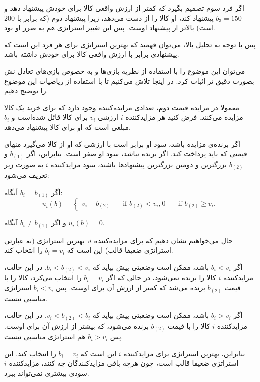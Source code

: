 اگر فرد سوم تصمیم بگیرد که کمتر از ارزش واقعی کالا برای خودش پیشنهاد دهد و $b_3=150$ پیشنهاد کند، او کالا را از دست می‌دهد، زیرا پیشنهاد دوم (که برابر با $200$ است) بالاتر از پیشنهاد اوست. پس این تغییر استراتژی هم به ضرر او بود.

پس با توجه به تحلیل بالا، می‌توان فهمید که بهترین استراتژی برای هر فرد این است که پیشنهادی برابر با ارزش واقعی کالا برای خودش داشته باشد.


می‌توان این موضوع را با استفاده از نظریه بازی‌ها و به خصوص بازی‌های تعادل نش بصورت دقیق تر اثبات کرد. در اینجا تلاش می‌کنیم تا با استفاده از ریاضیات این موضوع را توضیح دهیم.

معمولا در مزایده قیمت دوم، تعدادی مزایده‌کننده وجود دارد که برای خرید یک کالا مزایده می‌کنند. فرض کنید هر مزایدکننده $i$ ارزشی $v_i$ برای کالا قائل شده‌است و $b_i$ مبلغی است که او برای کالا پیشنهاد می‌دهد.

اگر برنده‌ی مزایده باشد، سود او برابر است با ارزشی که او از کالا می‌گیرد منهای قیمتی که باید پرداخت کند. اگر برنده نباشد، سود او صفر است. بنابراین، اگر $b_{(1)}$ و $b_{(2)}$ بزرگترین و دومین بزرگترین پیشنهاد‌ها باشند، سود مزایدکننده $i$ به صورت زیر تعریف می‌شود:


اگر $b_i = b_{(1)}$ آنگاه:
$$
u_i(b) =
\begin{cases}
	v_i - b_{(2)} &\quad \text{if } b_{(2)} < v_i \text{,} \
	0 &\quad \text{if } b_{(2)} \geq v_i \text{.}
\end{cases}
$$

و اگر $b_i \neq b_{(1)}$ آنگاه $u_i(b) = 0$.


حال می‌خواهیم نشان دهیم که برای مزایده‌کننده $i$، بهترین استراتژی (به عبارتی استراتژی ضعیفا قالب) این است که $b_i = v_i$ را انتخاب کند.

اگر $b_i < v_i$ باشد، ممکن است وضعیتی پیش بیاید که $b_i < b_{(2)} < v_i$. در این حالت، مزایدکننده $i$ کالا را برنده نمی‌شود، در حالی که اگر $b_i = v_i$ را انتخاب می‌کرد، کالا را با قیمت $b_{(2)}$ برنده می‌شد که کمتر از ارزش آن برای اوست. پس $b_i < v_i$ استراتژی مناسبی نیست.

اگر $b_i > v_i$ باشد، ممکن است وضعیتی پیش بیاید که $v_i < b_{(2)} < b_i$. در این حالت، مزایدکننده $i$ کالا را با قیمت $b_{(2)}$ برنده می‌شود، که بیشتر از ارزش آن برای اوست. پس $b_i > v_i$ هم استراتژی مناسبی نیست.

بنابراین، بهترین استراتژی برای مزایدکننده $i$ این است که $b_i = v_i$ را انتخاب کند. این استراتژی ضعیفا قالب است، چون هرچه باقی مزایدکنندگان چه کنند، مزایدکننده $i$ سودی بیشتری نمی‌تواند ببرد.